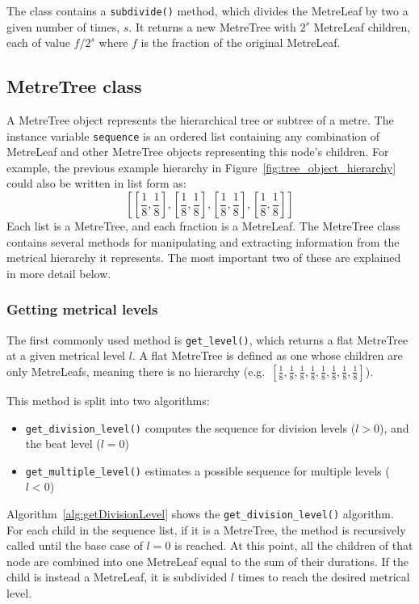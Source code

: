 \documentclass[12pt,twoside,openright]{report}
\begin{document}
The class contains a \verb'subdivide()' method, which divides the MetreLeaf by two a
given number of times, $s$. It returns a new MetreTree with $2^s$ MetreLeaf children, each of value $f/2^s$ where $f$ is the fraction of the original MetreLeaf.


\subsection{MetreTree class} \label{metretree}

A MetreTree object represents the hierarchical tree or subtree of a metre. The
instance variable \verb'sequence' is an ordered list containing any combination of
MetreLeaf and other MetreTree objects representing this node's children. For
example, the previous example hierarchy in Figure~\ref{fig:tree_object_hierarchy} could also be written in list form as:
\[\left[\left[\frac{1}{8},\frac{1}{8}\right],\left[\frac{1}{8},\frac{1}{8}\right],\left[\frac{1}{8},\frac{1}{8}\right],\left[\frac{1}{8},\frac{1}{8}\right]\right]\]
Each list is a
MetreTree, and each fraction is a MetreLeaf. The MetreTree class contains
several methods for manipulating and extracting information from the metrical
hierarchy it represents. The most important two of these are explained in more
detail below.

\subsubsection{Getting metrical levels} \label{get_level}

The first commonly used method is \verb'get_level()', which returns a flat MetreTree at
a given metrical level $l$. A flat MetreTree is defined as one whose children are
only MetreLeafs, meaning there is no hierarchy (e.g.\ $\left[\frac{1}{8},\frac{1}{8},\frac{1}{8},\frac{1}{8},\frac{1}{8},\frac{1}{8},\frac{1}{8},\frac{1}{8}\right]$).

This method is split into two algorithms:
\begin{itemize}
    \item \verb'get_division_level()' computes the sequence for division levels ($l>0$), and the beat level ($l=0$)
	\item \verb'get_multiple_level()' estimates a possible sequence for multiple levels ($l<0$)
\end{itemize}

Algorithm~\ref{alg:getDivisionLevel} shows the \verb'get_division_level()' algorithm. For each child in the
sequence list, if it is a MetreTree, the method is recursively called until the
base case of $l=0$ is reached. At this point, all the children of that node are
combined into one MetreLeaf equal to the sum of their durations. If the child is
instead a MetreLeaf, it is subdivided $l$ times to reach the desired metrical
level.
\end{document}
